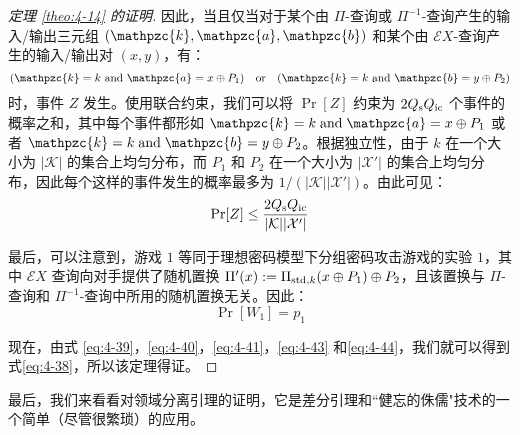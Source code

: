 \begin{proof}[定理 \ref{theo:4-14} 的证明]
因此，当且仅当对于某个由 $\Pi$-查询或 $\Pi^{-1}$-查询产生的输入/输出三元组 $(\mathpzc{k},\mathpzc{a},\mathpzc{b})$ 和某个由 $\mathcal{E}X$-查询产生的输入/输出对 $(x,y)$，有：
\begin{equation}
(\mathpzc{k}=k~{\rm and}~\mathpzc{a}=x\oplus P_1)
\quad\text{or}\quad
(\mathpzc{k}=k~{\rm and}~\mathpzc{b}=y\oplus P_2)
\end{equation}
时，事件 $Z$ 发生。使用联合约束，我们可以将 $\Pr[Z]$ 约束为 $2Q_{\rm s}Q_{\rm ic}$ 个事件的概率之和，其中每个事件都形如 $\mathpzc{k}=k\;\text{and}\;\mathpzc{a}=x\oplus P_1$ 或者 $\mathpzc{k}=k\;\text{and}\;\mathpzc{b}=y\oplus P_2$。根据独立性，由于 $k$ 在一个大小为 $|\mathcal{K}|$ 的集合上均匀分布，而 $P_1$ 和 $P_2$ 在一个大小为 $|\mathcal{X}'|$ 的集合上均匀分布，因此每个这样的事件发生的概率最多为 ${1}/{(|\mathcal{K}||\mathcal{X}'|)}$。由此可见：
\begin{equation}\label{eq:4-43}
\Pr[Z]\leq\frac{2Q_{\rm s}Q_{\rm ic}}{|\mathcal{K}||\mathcal{X}'|}
\end{equation}

最后，可以注意到，游戏 $1$ 等同于理想密码模型下分组密码攻击游戏的实验 $1$，其中 $\mathcal{E}X$ 查询向对手提供了随机置换 $\Pi'(x):=\Pi_{{\rm std},k}(x\oplus P_1) \oplus P_2$，且该置换与 $\Pi$-查询和 $\Pi^{-1}$-查询中所用的随机置换无关。因此：
\begin{equation}\label{eq:4-44}
\Pr[W_1]=p_1
\end{equation}

现在，由式 \ref{eq:4-39}，\ref{eq:4-40}，\ref{eq:4-41}，\ref{eq:4-43} 和\ref{eq:4-44}，我们就可以得到式\ref{eq:4-38}，所以该定理得证。
\end{proof}


最后，我们来看看对领域分离引理的证明，它是差分引理和``健忘的侏儒"技术的一个简单（尽管很繁琐）的应用。

